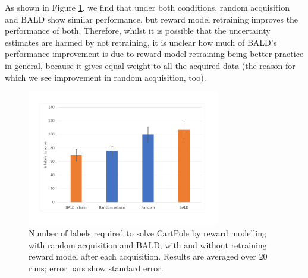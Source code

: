 \documentclass[11pt, a4paper, bibliography=totoc]{report}
\begin{document}
As shown in Figure \ref{fig:retrain}, we find that under both conditions, random acquisition and BALD show similar performance, but reward model retraining improves the performance of both. Therefore, whilst it is possible that the uncertainty estimates are harmed by not retraining, it is unclear how much of BALD's performance improvement is due to reward model retraining being better practice in general, because it gives equal weight to all the acquired data (the reason for which we see improvement in random acquisition, too).
\begin{figure}[h]
	\centering
	\includegraphics[width=0.75\textwidth]{reinit_rm}
	\caption{Number of labels required to solve CartPole by reward modelling with random acquisition and BALD, with and without retraining reward model after each acquisition. Results are averaged over 20 runs; error bars show standard error.}
	\label{fig:retrain}
\end{figure}
\end{document}
